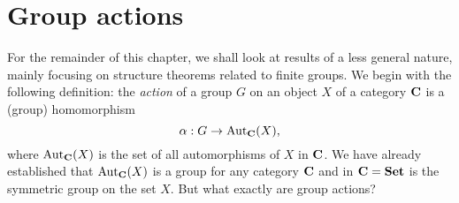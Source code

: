 \section{Group actions}
\label{sec:group-actions}

For the remainder of this chapter, we shall look at results of a less general
nature, mainly focusing on structure theorems related to finite groups. We begin
with the following definition: the \emph{action} of a group \(G\) on an object
\(X\) of a category \(\mathbf{C}\) is a (group) homomorphism
\[
    \alpha: G \to \operatorname{Aut}_{\mathbf{C}}(X),
\]
where \(\operatorname{Aut}_{\mathbf{C}}(X)\) is the set of all automorphisms of \(X\) in
\(\mathbf{C}\). We have already established that \(\operatorname{Aut}_{\mathbf{C}}(X)\) is a group
for any category \(\mathbf{C}\) and in \(\mathbf{C} = \mathbf{Set}\) is the symmetric group
on the set \(X\). But what exactly are group actions?

